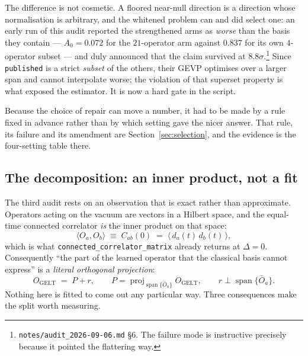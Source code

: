 \documentclass[11pt,a4paper]{article}
\newcommand{\Obar}{\bar{O}}
\newcommand{\Azero}{A_0}
\newcommand{\OG}{O_{\mathrm{GELT}}}
\newcommand{\spn}{\operatorname{span}}
\newcommand{\arm}[1]{\texttt{#1}}
\begin{document}
The difference is not cosmetic. A floored near-null direction is a direction
whose normalisation is arbitrary, and the whitened problem can and did select
one: an early run of this audit reported the strengthened arms as \emph{worse}
than the basis they contain --- $\Azero = 0.072$ for the $21$-operator arm
against $0.837$ for its own $4$-operator subset --- and duly announced that the
claim survived at $8.8\sigma$.\footnote{\texttt{notes/audit\_2026-09-06.md}
\S6. The failure mode is instructive precisely because it pointed the
flattering way.} Since \arm{published} is a strict \emph{subset} of the others,
their GEVP optimises over a larger span and cannot interpolate worse; the
violation of that superset property is what exposed the estimator. It is now a
hard gate in the script.

Because the choice of repair can move a number, it had to be made by a rule
fixed in advance rather than by which setting gave the nicer answer. That rule,
its failure and its amendment are Section~\ref{sec:selection}, and the evidence
is the four-setting table there.

\subsection{The decomposition: an inner product, not a fit}
\label{sec:innerproduct}

The third audit rests on an observation that is exact rather than approximate.
Operators acting on the vacuum are vectors in a Hilbert space, and the
equal-time connected correlator \emph{is} the inner product on that space:
\begin{equation}
  \langle O_a, O_b \rangle \;\equiv\; C_{ab}(0)
  \;=\; \big\langle\, d_a(t)\, d_b(t) \,\big\rangle ,
  \label{eq:metric}
\end{equation}
which is what \texttt{connected\_correlator\_matrix} already returns at
$\Delta = 0$. Consequently ``the part of the learned operator that the classical
basis cannot express'' is a \emph{literal orthogonal projection}:
\begin{equation}
  \OG \;=\; P + r,
  \qquad P = \operatorname{proj}_{\spn\{\Obar_a\}} \OG,
  \qquad r \perp \spn\{\Obar_a\} .
  \label{eq:decomp}
\end{equation}
Nothing here is fitted to come out any particular way. Three consequences make
the split worth measuring.
\end{document}
